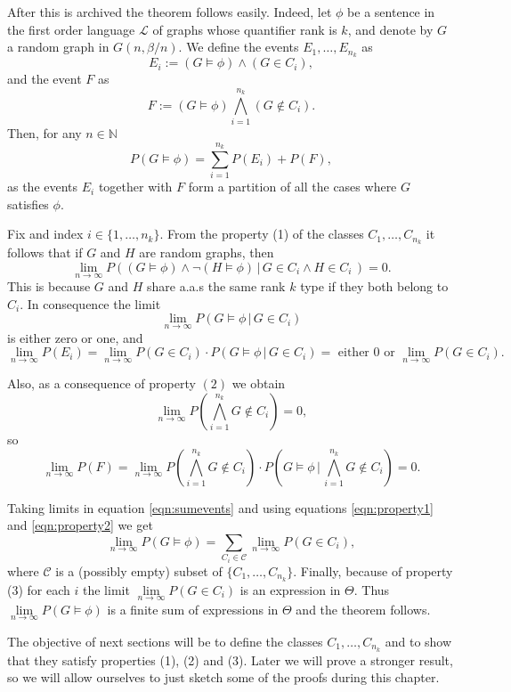 \documentclass[11pt,notitlepage]{report}
\theoremstyle{definition}
\newcommand{\N}{\mathbb{N}}
\newcommand{\Lan}{\mathcal{L}}
\newcommand{\Ln}{\lim\limits_{n\to \infty}}
\begin{document}
After this is archived the theorem follows easily. Indeed, let $\phi$ be a sentence 
in the first order language $\Lan$ of graphs whose quantifier rank is $k$, and denote by
$G$ a random graph in $G(n,\beta/n)$. We define the events $E_1,\dots,E_{n_k}$ as
\[E_i:= (G \models \phi) \wedge (G \in C_i),\]
and the  event $F$ as
\[F:= (G \models \phi) \bigwedge_{i=1}^{n_k} (G \notin C_i).\]
Then, for any $n\in \N$
\begin{equation} \label{eqn:sumevents}
P(G\models \phi) = \sum_{i=1}^{n_k} P(E_i)  + P(F),
\end{equation}
as the events $E_i$ together with $F$ form a partition of all the cases where $G$ satisfies $\phi$. \par

Fix and index $i\in \{1, \dots, n_k\}$. From the property (1) of the classes $C_1,\dots, C_{n_k}$ 
it follows that if $G$ and $H$ are random graphs, then
\[\Ln P((G\models \phi) \wedge \neg(H\models \phi) \, | \, G\in C_i \wedge H\in C_i \, ) = 0.\]
This is because $G$ and $H$ share a.a.s the same rank $k$ type if they both belong to $C_i$. 
In consequence the limit
\[ \Ln P(G\models \phi \, | \, G\in C_i )\] 
is either zero or one, and 
\begin{equation}\label{eqn:property1}
\Ln P(E_i)= \Ln P(G\in C_i)\cdot P(G\models \phi \, | \, G\in C_i)= \text{ either } 0 \text{ or } \Ln P(G\in C_i).
\end{equation} 
\par 
Also, as a consequence of property $(2)$ we obtain
\[\Ln P(\bigwedge_{i=1}^{n_k} G \notin C_i)=0, \] 
so
\begin{equation}\label{eqn:property2}
\Ln P(F)= \Ln P(\bigwedge_{i=1}^{n_k} G \notin C_i)\cdot P(G\models \phi \, | \, \bigwedge_{i=1}^{n_k} G \notin C_i)=0.  
\end{equation}
\par
Taking limits in equation \ref{eqn:sumevents} and using equations \ref{eqn:property1} and \ref{eqn:property2} 
we get
\[ \Ln P(G\models \phi) = \sum\limits_{C_i\in \mathcal{C}} \Ln P(G \in C_i) ,\]
where $\mathcal{C}$ is a (possibly empty) subset of $\{C_1,\dots, C_{n_k}\}$.
Finally, because of property (3) for each $i$ the limit $\Ln P(G \in C_i)$ is 
an expression in $\Theta$. Thus $\Ln P(G\models \phi)$ is a finite sum of expressions in $\Theta$
and the theorem follows. \par

The objective of next sections will be to define the classes $C_1,\dots, C_{n_k}$ and to show
that they satisfy properties (1), (2) and (3). Later we will prove a stronger result, so we will
allow ourselves to just sketch some of the proofs during this chapter. 
\end{document}
